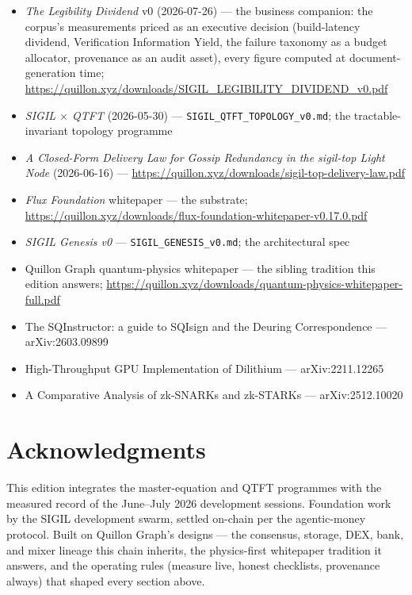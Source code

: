 \documentclass[10pt,a4paper]{article}
\begin{document}
\begin{itemize}[leftmargin=1.2em,itemsep=1pt]
numbers could be trusted;
\url{https://quillon.xyz/downloads/SIGIL_MEASUREMENT_BOOK_v0.pdf}
\item \emph{The Legibility Dividend} v0 (2026-07-26) — the business companion: the corpus's
measurements priced as an executive decision (build-latency dividend, Verification Information
Yield, the failure taxonomy as a budget allocator, provenance as an audit asset), every figure
computed at document-generation time;
\url{https://quillon.xyz/downloads/SIGIL_LEGIBILITY_DIVIDEND_v0.pdf}
\item \emph{SIGIL $\times$ QTFT} (2026-05-30) — \texttt{SIGIL\_QTFT\_TOPOLOGY\_v0.md};
the tractable-invariant topology programme
\item \emph{A Closed-Form Delivery Law for Gossip Redundancy in the sigil-top Light
Node} (2026-06-16) — \url{https://quillon.xyz/downloads/sigil-top-delivery-law.pdf}
\item \emph{Flux Foundation} whitepaper — the substrate;
\url{https://quillon.xyz/downloads/flux-foundation-whitepaper-v0.17.0.pdf}
\item \emph{SIGIL Genesis v0} — \texttt{SIGIL\_GENESIS\_v0.md}; the architectural spec
\item Quillon Graph quantum-physics whitepaper — the sibling tradition this edition
answers; \url{https://quillon.xyz/downloads/quantum-physics-whitepaper-full.pdf}
\item The SQInstructor: a guide to SQIsign and the Deuring Correspondence —
arXiv:2603.09899
\item High-Throughput GPU Implementation of Dilithium — arXiv:2211.12265
\item A Comparative Analysis of zk-SNARKs and zk-STARKs — arXiv:2512.10020
\end{itemize}

\section*{Acknowledgments}

This edition integrates the master-equation and QTFT programmes with the measured
record of the June--July 2026 development sessions. Foundation work by the SIGIL
development swarm, settled on-chain per the agentic-money protocol. Built on Quillon
Graph's designs — the consensus, storage, DEX, bank, and mixer lineage this chain
inherits, the physics-first whitepaper tradition it answers, and the operating rules
(measure live, honest checklists, provenance always) that shaped every section above.
\end{document}
